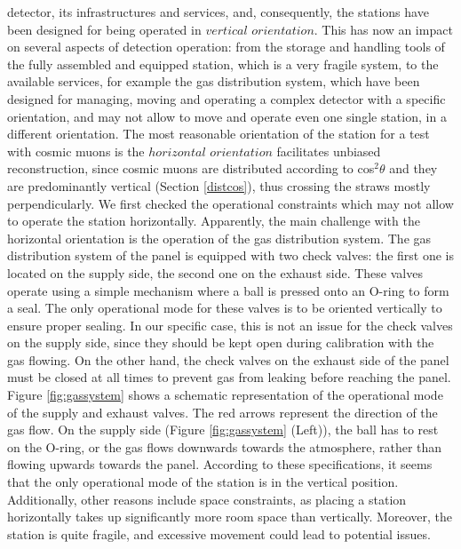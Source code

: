  detector, its infrastructures 
and services, and, consequently, the stations have been
designed for being operated in  
$vertical$ $orientation$. This has now an impact 
on several aspects of detection operation: from 
the storage and
handling tools of the fully assembled and 
equipped station, which is a very fragile system, to
the available services, for example the gas 
distribution system, which have been designed for
managing, moving and operating a complex 
detector with a specific orientation, and may not
allow to move and operate even one single 
station, in a different orientation. 
The most reasonable orientation of the station for a test with
cosmic muons is the $horizontal$ $orientation$
 facilitates unbiased 
reconstruction, since cosmic muons are distributed according to 
cos$^2\theta$ and they are predominantly vertical 
(Section \ref{distcos}), thus crossing the straws mostly perpendicularly.
We first checked the operational constraints
which may not allow to operate the station horizontally.
Apparently, the main challenge with the horizontal orientation is the operation of the gas
distribution system. The gas distribution system of the panel is equipped with two check valves:
the first one is located on the supply side, the second one on the exhaust side. These valves
operate using a simple mechanism where a ball is pressed onto an O-ring to form a seal. The
only operational mode for these valves is to be oriented vertically to ensure proper sealing. In
our specific case, this is not an issue for the check valves on the supply side, since they should
be kept open during calibration with the gas flowing. On the other hand, the check valves on
the exhaust side of the panel must be closed at all times to prevent gas from leaking before
reaching the panel. Figure \ref{fig:gassystem} shows a schematic 
representation of the operational mode of the supply 
and exhaust valves. The red arrows represent the 
direction of the gas flow. On the supply side (Figure 
\ref{fig:gassystem} (Left)), the ball has to rest on the 
O-ring, or the gas flows downwards towards the atmosphere, 
rather than flowing upwards towards the panel. According 
to these specifications, it seems that the only operational 
mode of the station is in the vertical position. 
Additionally, other reasons include space constraints, as placing 
a station horizontally takes up significantly more room space than 
vertically. Moreover, the station is quite fragile, and 
excessive movement could lead to potential issues.

